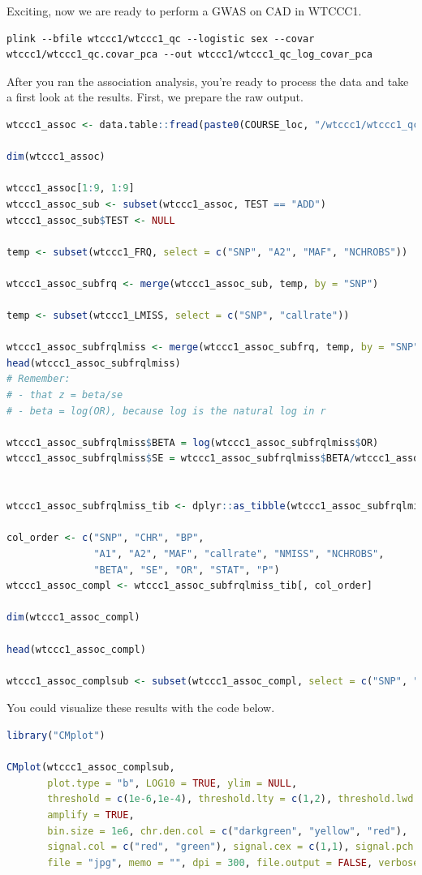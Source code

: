 \documentclass[
]{book}
\begin{document}
Exciting, now we are ready to perform a GWAS on CAD in WTCCC1.

\begin{lstlisting}
plink --bfile wtccc1/wtccc1_qc --logistic sex --covar wtccc1/wtccc1_qc.covar_pca --out wtccc1/wtccc1_qc_log_covar_pca
\end{lstlisting}

After you ran the association analysis, you're ready to process the data and take a first look at the results. First, we prepare the raw output.

\begin{lstlisting}[language=R]
wtccc1_assoc <- data.table::fread(paste0(COURSE_loc, "/wtccc1/wtccc1_qc_log_covar_pca.assoc.logistic"))

dim(wtccc1_assoc)

wtccc1_assoc[1:9, 1:9]
wtccc1_assoc_sub <- subset(wtccc1_assoc, TEST == "ADD")
wtccc1_assoc_sub$TEST <- NULL

temp <- subset(wtccc1_FRQ, select = c("SNP", "A2", "MAF", "NCHROBS"))

wtccc1_assoc_subfrq <- merge(wtccc1_assoc_sub, temp, by = "SNP")

temp <- subset(wtccc1_LMISS, select = c("SNP", "callrate"))

wtccc1_assoc_subfrqlmiss <- merge(wtccc1_assoc_subfrq, temp, by = "SNP")
head(wtccc1_assoc_subfrqlmiss)
# Remember:
# - that z = beta/se
# - beta = log(OR), because log is the natural log in r

wtccc1_assoc_subfrqlmiss$BETA = log(wtccc1_assoc_subfrqlmiss$OR)
wtccc1_assoc_subfrqlmiss$SE = wtccc1_assoc_subfrqlmiss$BETA/wtccc1_assoc_subfrqlmiss$STAT


wtccc1_assoc_subfrqlmiss_tib <- dplyr::as_tibble(wtccc1_assoc_subfrqlmiss)

col_order <- c("SNP", "CHR", "BP",
               "A1", "A2", "MAF", "callrate", "NMISS", "NCHROBS",
               "BETA", "SE", "OR", "STAT", "P")
wtccc1_assoc_compl <- wtccc1_assoc_subfrqlmiss_tib[, col_order]

dim(wtccc1_assoc_compl)

head(wtccc1_assoc_compl)

wtccc1_assoc_complsub <- subset(wtccc1_assoc_compl, select = c("SNP", "CHR", "BP", "P"))
\end{lstlisting}

You could visualize these results with the code below.

\begin{lstlisting}[language=R]
library("CMplot")

CMplot(wtccc1_assoc_complsub,
       plot.type = "b", LOG10 = TRUE, ylim = NULL,
       threshold = c(1e-6,1e-4), threshold.lty = c(1,2), threshold.lwd = c(1,1), threshold.col = c("black", "grey"),
       amplify = TRUE,
       bin.size = 1e6, chr.den.col = c("darkgreen", "yellow", "red"),
       signal.col = c("red", "green"), signal.cex = c(1,1), signal.pch = c(19,19),
       file = "jpg", memo = "", dpi = 300, file.output = FALSE, verbose = TRUE)
\end{lstlisting}
\end{document}
